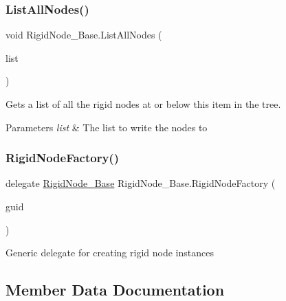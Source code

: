 \subsubsection{\texorpdfstring{List\+All\+Nodes()}{ListAllNodes()}\hspace{0.1cm}{\footnotesize\ttfamily [2/2]}}
{\footnotesize\ttfamily void Rigid\+Node\+\_\+\+Base.\+List\+All\+Nodes (\begin{DoxyParamCaption}\item[{List$<$ \hyperlink{class_rigid_node___base}{Rigid\+Node\+\_\+\+Base} $>$}]{list }\end{DoxyParamCaption})}



Gets a list of all the rigid nodes at or below this item in the tree. 


\begin{DoxyParams}{Parameters}
{\em list} & The list to write the nodes to\\
\hline
\end{DoxyParams}
\mbox{\label{class_rigid_node___base_ae13cbb7e730cd0e19c77efa84edbceca}} 
\subsubsection{\texorpdfstring{Rigid\+Node\+Factory()}{RigidNodeFactory()}}
{\footnotesize\ttfamily delegate \hyperlink{class_rigid_node___base}{Rigid\+Node\+\_\+\+Base} Rigid\+Node\+\_\+\+Base.\+Rigid\+Node\+Factory (\begin{DoxyParamCaption}\item[{Guid}]{guid }\end{DoxyParamCaption})}



Generic delegate for creating rigid node instances 



\subsection{Member Data Documentation}
\mbox{\label{class_rigid_node___base_a16a5bf5e9b0b985e723da889daa1128d}} 
